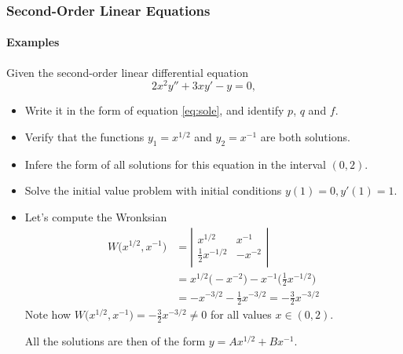 \documentclass[9pt,xcolor=x11names,compress]{beamer}
\begin{document}
\begin{frame}\frametitle{Second-Order Linear Equations}
\framesubtitle{Examples}
\begin{block}{Given the second-order linear differential equation}
\begin{equation*}
	2x^2y''+3xy'-y=0,
\end{equation*}
\begin{itemize}
	\item Write it in the form of equation \eqref{eq:sole}, and identify $p$, $q$ and $f$.
	\item Verify that the functions $y_1=x^{1/2}$ and $y_2=x^{-1}$ are both solutions.
	\item \alert{Infere the form of all solutions for this equation in the interval $(0,2)$.}
	\item Solve the initial value problem with initial conditions $y(1)=0, y'(1)=1$.
\end{itemize}
\end{block}
\begin{itemize}
\item Let's compute the Wronksian
\begin{align*}
	W\big(x^{1/2},x^{-1}\big) &= \left| \begin{matrix}
		x^{1/2} & x^{-1} \\ \tfrac{1}{2}x^{-1/2} & -x^{-2} 
	\end{matrix} \right| \\
	&= x^{1/2} \big( -x^{-2} \big) - x^{-1} \big( \tfrac{1}{2} x^{-1/2} \big) \\
	&= -x^{-3/2}-\tfrac{1}{2}x^{-3/2} = -\tfrac{3}{2}x^{-3/2}
\end{align*}
Note how $W\big( x^{1/2},x^{-1} \big) = -\tfrac{3}{2}x^{-3/2} \neq 0$ for all values $x \in (0,2)$.

All the solutions are then of the form $y=Ax^{1/2}+Bx^{-1}$.
\end{itemize}
\end{frame}
\end{document}
